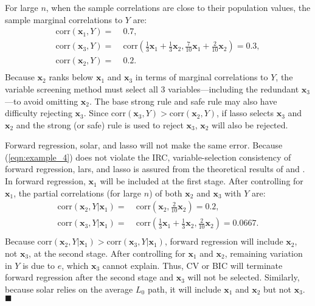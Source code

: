\documentclass[11pt,review,authoryear]{elsarticle}
\begin{document}
For large $n$, when the sample correlations are close to their population values, the sample marginal correlations to $Y$ are:
%
\begin{equation}
  \begin{aligned}
    \mathrm{corr} \left( \mathbf{x}_1, Y \right)  = & \;0.7, \\
    \mathrm{corr} \left( \mathbf{x}_3, Y \right)  = & \;\mathrm{corr} \left( \frac{1}{3} \mathbf{x}_1 + \frac{1}{3} \mathbf{x}_2, \frac{7}{10} \mathbf{x}_1 +  \frac{2}{10} \mathbf{x}_2 \right)
    = 0.3, \\
    \mathrm{corr} \left( \mathbf{x}_2, Y \right)  = & \;0.2. \\
  \end{aligned}
\end{equation}
%
Because $\mathbf{x}_2$ ranks below $\mathbf{x}_1$ and $\mathbf{x}_3$ in terms of marginal correlations to $Y$, the variable screening method must select all $3$ variables---including the redundant $\mathbf{x}_3$---to avoid omitting $\mathbf{x}_2$. The base strong rule and safe rule may also have difficulty rejecting $\mathbf{x}_3$. Since $\mathrm{corr} \left( \mathbf{x}_3, Y \right)>\mathrm{corr} \left( \mathbf{x}_2, Y \right)$, if lasso selects $\mathbf{x}_3$ and $\mathbf{x}_2$ and the strong (or safe) rule is used to reject $\mathbf{x}_3$, $\mathbf{x}_2$ will also be rejected.

Forward regression, solar, and lasso will not make the same error. Because (\ref{eqn:example_4}) does not violate the IRC, variable-selection consistency of forward regression, lars, and lasso is assured from the theoretical results of \citet{zhang09} and \citet{zhaoyu06}. In forward regression, $\mathbf{x}_1$ will be included  at the first stage. After controlling for $\mathbf{x}_1$, the partial correlations (for large $n$) of both $\mathbf{x}_2$ and $\mathbf{x}_3$ with $Y$ are:
%
\begin{equation}
  \begin{aligned}
    \mathrm{corr} \left( \mathbf{x}_2, Y \vert \mathbf{x}_1 \right)  = & \;\mathrm{corr} \left( \mathbf{x}_2, \frac{2}{10} \mathbf{x}_2 \right)
    = 0.2, \\
    \mathrm{corr} \left( \mathbf{x}_3, Y \vert \mathbf{x}_1 \right)  = & \;\mathrm{corr} \left( \frac{1}{3} \mathbf{x}_1 + \frac{1}{3} \mathbf{x}_2, \frac{2}{10} \mathbf{x}_2 \right)
    = 0.0667. \\
  \end{aligned}
\end{equation}
%
Because $\mathrm{corr}(\mathbf{x}_2, Y \vert \mathbf{x}_1)>\mathrm{corr}(\mathbf{x}_3, Y \vert \mathbf{x}_1)$, forward regression will include $\mathbf{x}_2$, not $\mathbf{x}_3$, at the second stage. After controlling for $\mathbf{x}_1$ and $\mathbf{x}_2$, remaining variation in $Y$ is due to $e$, which $\mathbf{x}_3$ cannot explain. Thus, CV or BIC will terminate forward regression after the second stage and $\mathbf{x}_3$ will not be selected. Similarly, because solar relies on the average $L_0$ path, it will include $\mathbf{x}_1$ and $\mathbf{x}_2$ but not $\mathbf{x}_3$. $\blacksquare$
\end{document}
